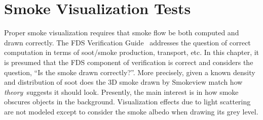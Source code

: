 \documentclass[11pt,twoside]{book}
\newcommand{\degC}{$^\circ$C}
\newcommand{\figoptions}{hbp}
\begin{document}





\chapter{Smoke Visualization Tests}

Proper smoke visualization requires that smoke flow be both computed and drawn correctly.
The FDS Verification Guide~\cite{FDS_Verification_Guide} addresses the question of correct
computation in terms of soot/smoke production, transport, etc.  In this chapter, it is presumed that the FDS component of verification is correct and considers the question, ``Is the smoke drawn correctly?''.  More precisely, given a known density and distribution of soot does the 3D smoke drawn by Smokeview match how {\em theory}\ suggests it should look.  Presently, the main interest is in how smoke obscures objects in the background.  Visualization effects due to light scattering are not modeled except to consider the smoke albedo when drawing its grey level.
\end{document}
